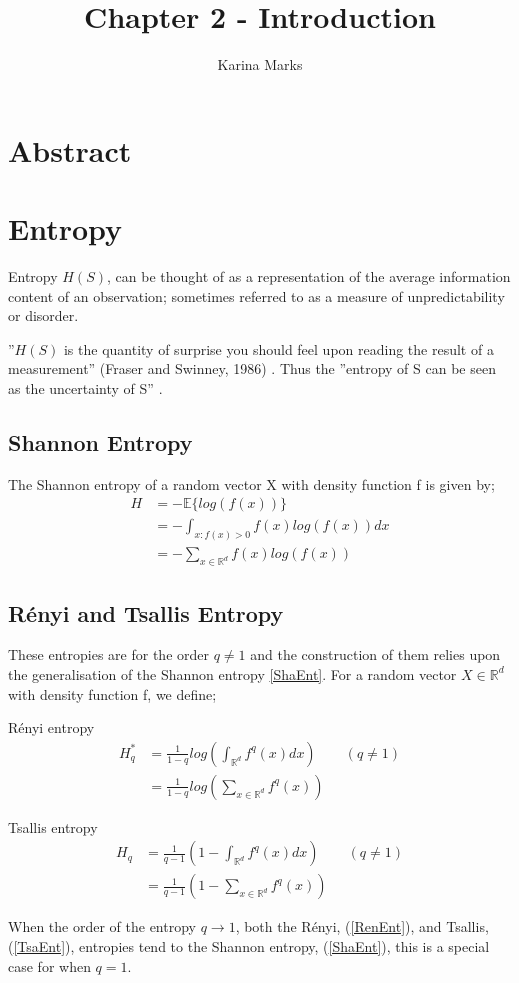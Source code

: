 \documentclass{article}
\title{Chapter 2 - Introduction}
\author{Karina Marks}
\begin{document}
\maketitle

\section{Abstract}


\section{Entropy}

Entropy $H(S)$, can be thought of as a representation of the average information content of an observation; sometimes referred to as a measure of unpredictability or disorder. 

''$H(S)$ is the quantity of surprise you should feel upon reading the result of a measurement'' (Fraser and Swinney, 1986) \cite{entdef1}. Thus the ''entropy of S can be seen as the uncertainty of S'' \cite{paper7}.

\subsection{Shannon Entropy}
The Shannon entropy of a random vector X with density function f is given by;
\begin{align} 
H &= - \mathbb{E} \{log(f(x))\} \nonumber \\
&= - \int_{x : f(x) > 0} f(x) log(f(x)) dx \nonumber \\
&= - \sum_{x \in \mathbb{R}^{d}} f(x) log(f(x)) \label{ShaEnt}
\end{align} 

\subsection{ R\'enyi and Tsallis Entropy}
These entropies are for the order $q \neq 1$ and the construction of them relies upon the generalisation of the Shannon entropy \ref{ShaEnt}. For a random vector $X \in \mathbb{R}^d$ with density function f, we define;

R\'enyi entropy
\begin{align} 
H_{q}^{*} &= \frac{1}{1-q} log \left( \int_{\mathbb{R}^d} f^q (x) dx \right) \quad  \quad (q \neq 1) \label{RenEnt} \\
&=  \frac{1}{1-q} log \left( \sum_{x \in \mathbb{R}^{d}} f^q (x) \right) \nonumber 
\end{align}

Tsallis entropy
\begin{align} 
H_{q} &= \frac{1}{q-1} \left(1 - \int_{\mathbb{R}^d} f^q (x) dx \right)  \quad  \quad (q \neq 1) \label{TsaEnt} \\
&=  \frac{1}{q-1} \left(1 - \sum_{x \in \mathbb{R}^d} f^q (x) \right) \nonumber 
\end{align}

When the order of the entropy $q \to 1$, both the R\'enyi, (\ref{RenEnt}), and Tsallis, (\ref{TsaEnt}), entropies tend to the Shannon entropy, (\ref{ShaEnt}), this is a special case for when $q=1$. 
\end{document}
